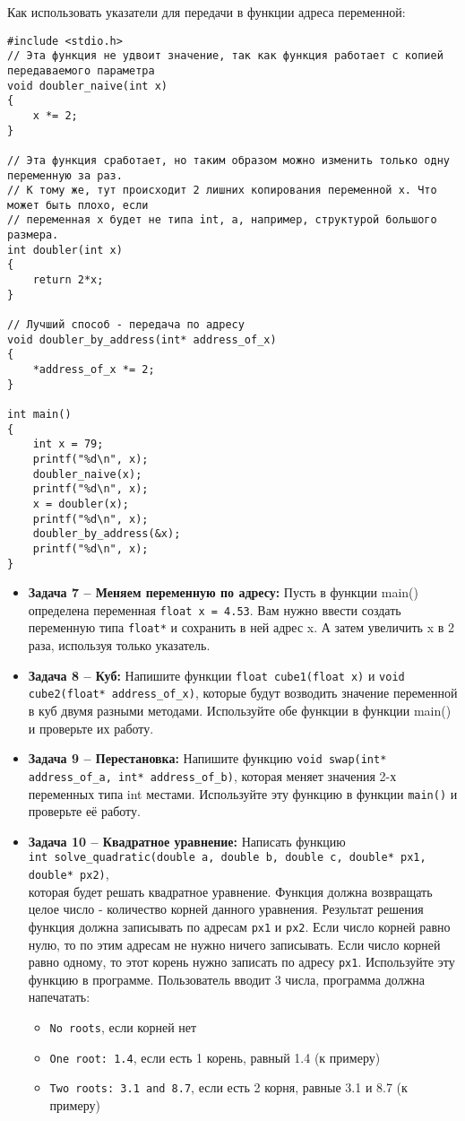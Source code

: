 \documentclass{article}
\begin{document}
Как использовать указатели для передачи в функции адреса переменной: \\
\begin{lstlisting}
#include <stdio.h>
// Эта функция не удвоит значение, так как функция работает с копией передаваемого параметра
void doubler_naive(int x)
{
	x *= 2;
}

// Эта функция сработает, но таким образом можно изменить только одну переменную за раз.
// К тому же, тут происходит 2 лишних копирования переменной x. Что может быть плохо, если 
// переменная x будет не типа int, а, например, структурой большого размера.
int doubler(int x) 
{
	return 2*x;
}

// Лучший способ - передача по адресу
void doubler_by_address(int* address_of_x) 
{
	*address_of_x *= 2;
}

int main() 
{
	int x = 79;
	printf("%d\n", x);
	doubler_naive(x);
	printf("%d\n", x);
	x = doubler(x);
	printf("%d\n", x);
	doubler_by_address(&x);
	printf("%d\n", x);
}
\end{lstlisting}
\begin{itemize}
\item \textbf{Задача 7 -- Меняем переменную по адресу:} Пусть в функции main() определена переменная \texttt{float\ x = 4.53}. Вам нужно ввести создать переменную типа \texttt{float*} и сохранить в ней адрес x. А затем увеличить x в 2 раза, используя только указатель.
\item \textbf{Задача 8 -- Куб:} Напишите функции \texttt{float cube1(float x)} и \texttt{void cube2(float* address\_of\_x)}, которые будут возводить значение переменной в куб двумя разными методами. Используйте обе функции в функции main() и проверьте их работу. 
\item \textbf{Задача 9 -- Перестановка:} Напишите функцию \texttt{void swap(int* address\_of\_a, int* address\_of\_b)}, которая меняет значения 2-х переменных типа int местами. Используйте эту функцию в функции \texttt{main()} и проверьте её работу. 
\item \textbf{Задача 10 -- Квадратное уравнение:} Написать функцию\\
 \texttt{int solve\_quadratic(double a, double b, double c, double* px1, double* px2)},\\
которая будет решать квадратное уравнение. Функция должна возвращать целое число - количество корней данного уравнения. Результат решения функция должна записывать по адресам \texttt{px1} и \texttt{px2}. Если число корней равно нулю, то по этим адресам не нужно ничего записывать. Если число корней равно одному, то этот корень нужно записать по адресу \texttt{px1}. Используйте эту функцию в программе. Пользователь вводит 3 числа, программа должна напечатать:
\begin{itemize}
\item \texttt{No roots}, если корней нет
\item \texttt{One root: 1.4}, если есть 1 корень, равный 1.4 (к примеру)
\item \texttt{Two roots: 3.1 and 8.7}, если есть 2 корня, равные 3.1 и 8.7 (к примеру)
\end{itemize}
\end{itemize}
\end{document}
